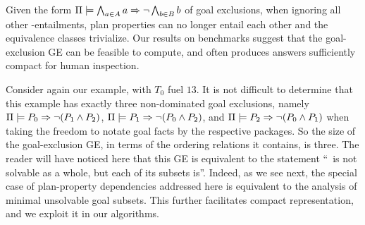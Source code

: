 Given the form $\Pi \models \bigwedge_{a \in A} a \Rightarrow \neg
  \bigwedge_{b \in B} b$ of goal exclusions, when ignoring all other
\plans-entailments, plan properties can no longer entail each other
and the equivalence classes trivialize.
%
%
%
%
%
%
Our results on benchmarks suggest that the goal-exclusion GE can be
feasible to compute, and often produces answers sufficiently compact
for human inspection.

Consider again our example, with $T_0$ fuel $13$. It is not difficult
to determine that this example has exactly three non-dominated goal
exclusions, namely $\Pi \models P_0 \Rightarrow \neg (P_1 \wedge P_2)$,
$\Pi \models P_1 \Rightarrow \neg (P_0 \wedge P_2)$, and
$\Pi \models P_2 \Rightarrow \neg (P_0 \wedge P_1)$ when taking the freedom
to notate goal facts by the respective packages.
%
%
So the size of the goal-exclusion GE, in terms of the ordering
relations it contains, is three. The reader will have noticed here
that this GE is equivalent to the statement ``\goalsoft\ is not
solvable as a whole, but each of its subsets is''. Indeed, as we see
next, the special case of plan-property dependencies addressed here is
equivalent to the analysis of minimal unsolvable goal subsets.  This
further facilitates compact representation, and we exploit it in our
algorithms.
